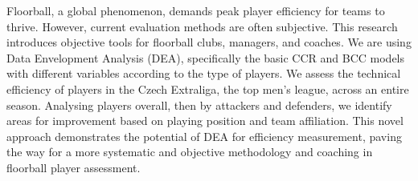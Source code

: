 
\begin{Abstrakt}
    Floorball, a global phenomenon, demands peak player efficiency for teams to thrive. However, current evaluation methods are often subjective. This research introduces objective tools for floorball clubs, managers, and coaches. We are using Data Envelopment Analysis (DEA), specifically the basic CCR and BCC models with different variables according to the type of players. We assess the technical efficiency of players in the Czech Extraliga, the top men's league, across an entire season. Analysing players overall, then by attackers and defenders, we identify areas for improvement based on playing position and team affiliation. This novel approach demonstrates the potential of DEA for efficiency measurement, paving the way for a more systematic and objective methodology and coaching in floorball player assessment.
\end{Abstrakt}



\clearpage